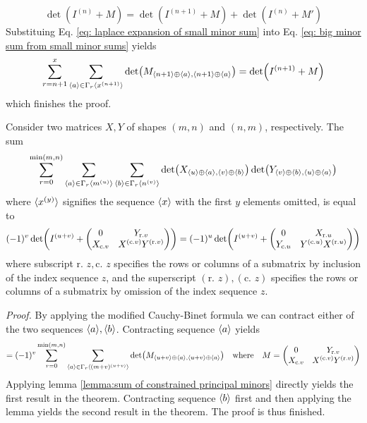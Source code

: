 	\begin{equation} \label{eq: laplace expansion of small minor sum}
	\det(I^{(n)}+M)=\det(I^{(n+1)}+M)+\det(I^{(n)}+M')
	\end{equation}
	Substituing Eq. \ref{eq: laplace expansion of small minor sum} into Eq. \ref{eq: big minor sum from small minor sums} yields
	\begin{equation}
	\sum_{r=n+1}^{x}\sum_{\langle a\rangle\in\Gamma_r\langle x^{(n+1)}\rangle}\det(M_{\langle n+1\rangle\oplus\langle a\rangle,\langle n+1\rangle\oplus\langle a\rangle})=\det(I^{(n+1)}+M)
	\end{equation}
	which finishes the proof.
	
	\begin{lemma}\label{lemma:symmetrically constrained sum of complementary minors}
	Consider two matrices $X, Y$ of shapes $(m,n)$ and $(n,m)$, respectively. The sum
	\begin{equation}
	\sum_{r=0}^{\min(m,n)}\sum_{\langle a\rangle\in\Gamma_r\langle m^{(u)}\rangle}\sum_{\langle b\rangle\in\Gamma_r\langle n^{(v)}\rangle}\det(X_{\langle u\rangle\oplus\langle a\rangle,\langle v\rangle\oplus\langle b\rangle})\det(Y_{\langle v\rangle\oplus\langle b\rangle,\langle u\rangle\oplus\langle a\rangle})
	\end{equation}
	where $\langle x^{(y)}\rangle$ signifies the sequence $\langle x\rangle$ with the first $y$ elements omitted, is equal to
	\begin{equation}
	(-1)^v\det(I^{(u+v)}+\mqty(0 & Y_{\text{r.} v} \\ X_{\text{c.} v} & X^{(\text{c.} v)} Y^{(\text{r.} v)}))=(-1)^u\det(I^{(u+v)}+\mqty(0 & X_{\text{r.} u} \\ Y_{\text{c.} u} & Y^{(\text{c.} u)} X^{(\text{r.} u)}))
	\end{equation}
	where subscript $\text{r. }z,\text{c. }z$ specifies the rows or columns of a submatrix by inclusion of the index sequence $z$, and the superscript $(\text{r. }z),(\text{c. }z)$ specifies the rows or columns of a submatrix by omission of the index sequence $z$.
	\end{lemma}
	\textit{Proof.} By applying the modified Cauchy-Binet formula \cite[App. C]{modified_cauchy_binet} we can contract either of the two sequences $\langle a\rangle,\langle b\rangle$. Contracting sequence $\langle a\rangle$ yields
	\begin{equation}
	=(-1)^v\sum_{r=0}^{\min(m,n)}\sum_{\seq{a}\in\Gamma_r\seq{(m+v)^{(u+v)}}}\det(M_{\seq{u+v}\oplus\seq{a},\seq{u+v}\oplus\seq{a}})\qq{where}M=\mqty(0 & Y_{\text{r.} v} \\ X_{\text{c.} v} & X^{(\text{c.} v)}Y^{(\text{r.} v)})
	\end{equation}
	Applying lemma \ref{lemma:sum of constrained principal minors} directly yields the first result in the theorem. Contracting sequence $\langle b\rangle$ first and then applying the lemma yields the second result in the theorem. The proof is thus finished.
	
